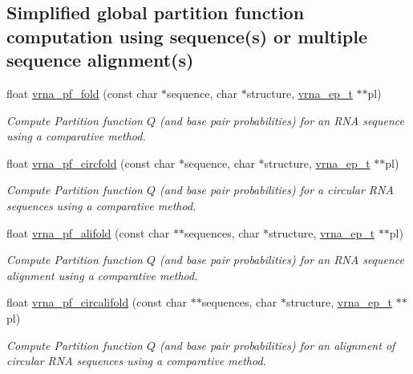 \subsection*{Simplified global partition function computation using sequence(s) or multiple sequence alignment(s)}
\begin{DoxyCompactItemize}
\item 
float \hyperlink{group__part__func__global_gac4a2a74a79e49818bc35412a2b392c7e}{vrna\+\_\+pf\+\_\+fold} (const char $\ast$sequence, char $\ast$structure, \hyperlink{group__struct__utils__plist_gab9ac98ab55ded9fb90043b024b915aca}{vrna\+\_\+ep\+\_\+t} $\ast$$\ast$pl)
\begin{DoxyCompactList}\small\item\em Compute Partition function $Q$ (and base pair probabilities) for an R\+NA sequence using a comparative method. \end{DoxyCompactList}\item 
float \hyperlink{group__part__func__global_ga87e5a77b6e50dd54e9d032a9b92973be}{vrna\+\_\+pf\+\_\+circfold} (const char $\ast$sequence, char $\ast$structure, \hyperlink{group__struct__utils__plist_gab9ac98ab55ded9fb90043b024b915aca}{vrna\+\_\+ep\+\_\+t} $\ast$$\ast$pl)
\begin{DoxyCompactList}\small\item\em Compute Partition function $Q$ (and base pair probabilities) for a circular R\+NA sequences using a comparative method. \end{DoxyCompactList}\item 
float \hyperlink{group__part__func__global_ga374e31a0f326b2c5da5b84e143a63f38}{vrna\+\_\+pf\+\_\+alifold} (const char $\ast$$\ast$sequences, char $\ast$structure, \hyperlink{group__struct__utils__plist_gab9ac98ab55ded9fb90043b024b915aca}{vrna\+\_\+ep\+\_\+t} $\ast$$\ast$pl)
\begin{DoxyCompactList}\small\item\em Compute Partition function $Q$ (and base pair probabilities) for an R\+NA sequence alignment using a comparative method. \end{DoxyCompactList}\item 
float \hyperlink{group__part__func__global_gab70fe6c9a78b79cc5669881720926e1d}{vrna\+\_\+pf\+\_\+circalifold} (const char $\ast$$\ast$sequences, char $\ast$structure, \hyperlink{group__struct__utils__plist_gab9ac98ab55ded9fb90043b024b915aca}{vrna\+\_\+ep\+\_\+t} $\ast$$\ast$pl)
\begin{DoxyCompactList}\small\item\em Compute Partition function $Q$ (and base pair probabilities) for an alignment of circular R\+NA sequences using a comparative method. \end{DoxyCompactList}\item 

\end{DoxyCompactItemize}
